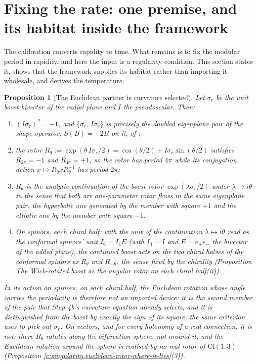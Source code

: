 \documentclass[11pt]{article}
\newtheorem{proposition}[theorem]{Proposition}
\theoremstyle{definition}
\theoremstyle{plain}
\providecommand{\Cl}{}\renewcommand{\Cl}{\mathrm{Cl}}
\begin{document}
\section{Fixing the rate: one premise, and its habitat inside the framework}

\label{c:note.state-selection.setting-fixing-rate-one-premise-habitat}
The calibration converts rapidity to time. What remains is to fix the modular period in rapidity, and here the input is a regularity condition. This section states it, shows that the framework supplies its habitat rather than importing it wholesale, and derives the temperature.

\begin{proposition}[The Euclidean partner is curvature selected]\label{c:state-selection.euclidean-partner-curvature-selected}
Let $\sigma_r$ be the unit boost bivector of the radial plane and $I$ the pseudoscalar. Then:
\begin{enumerate}
\item $(I\sigma_r)^{2} = -1$, and $\{\sigma_r,\, I\sigma_r\}$ is precisely the doubled eigenplane pair of the shape operator, $S(B) = -2B$ on it, of \cite[Thm.~6.1]{ButlerT5};
\item the rotor $R_\theta := \exp(\theta\, I\sigma_r/2) = \cos(\theta/2) + I\sigma_r \sin(\theta/2)$ satisfies $R_{2\pi} = -1$ and $R_{4\pi} = +1$, so the rotor has period $4\pi$ while its conjugation action $x \mapsto R_\theta x R_\theta^{-1}$ has period $2\pi$;
\item $R_\theta$ is the analytic continuation of the boost rotor $\exp(\lambda\sigma_r/2)$ under $\lambda \mapsto i\theta$ in the sense that both are one-parameter rotor flows in the same eigenplane pair, the hyperbolic one generated by the member with square $+1$ and the elliptic one by the member with square $-1$.
\item On spinors, each chiral half: with the unit of the continuation $\lambda \mapsto i\theta$ read as the conformal spinors' unit $I_{6} = I_{4}E$ (with $I_{4} = I$ and $E = e_{+}e_{-}$ the bivector of the added plane), the continued boost acts on the two chiral halves of the conformal spinors as $R_\theta$ and $R_{-\theta}$, the sense fixed by the chirality (Proposition \emph{The Wick-rotated boost as the angular rotor on each chiral half}(ii)).
\end{enumerate}
In its action on spinors, on each chiral half, the Euclidean rotation whose angle carries the periodicity is therefore not an imported device: it is the second member of the pair that Step 4b's curvature equation already selects, and it is distinguished from the boost by exactly the sign of its square, the same criterion \cite[Cor.~6.4]{ButlerT5} uses to pick out $\sigma_r$. On vectors, and for every holonomy of a real connection, it is not: there $R_\theta$ rotates along the bifurcation sphere, not around it, and the Euclidean rotation around the sphere is realised by no real rotor of $\Cl(1,3)$ (Proposition \ref{c:singularity.euclidean-rotor-where-it-lies}(3)).
\end{proposition}
\end{document}
